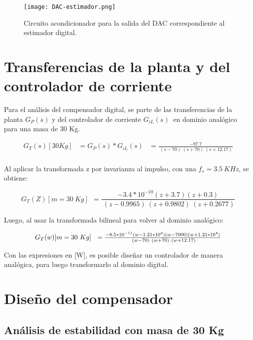 \begin{figure}[H]
	\centering
	\texttt{[image: DAC-estimador.png]}
	\caption{Circuito acondicionador para la salida del DAC correspondiente al estimador digital.}
	\label{fig:DAC-estimador}
\end{figure}

\section{Transferencias de la planta y del controlador de corriente}

\noindent Para el an\'{a}lisis del compensador digital, se parte de las transferencias de la planta $G_P(s)$ y del controlador de corriente $G_{iL}(s)\ $ en dominio anal\'{o}gico para una masa de 30 Kg.

\begin{equation} 
	\begin{aligned}
	G_T(s)[30Kg]&=G_P(s)*G_{iL}(s)&=\frac{-87.7}{\ (s-70)\ (s+70)\ (s+12.17)}\\
	\end{aligned}
\end{equation}

\noindent Al aplicar la transformada z por invarianza al impulso, con una $f_s=3.5\ KHz$, se obtiene:

\begin{equation} 
	G_T(Z)[m=30\ Kg]\ \ =\frac{-3.4*10^{-10}(z+3.7)(z+0.3)}{\ (z-0.9965)\ (z+0.9802)\ (z+0.2677)}
\end{equation}

\noindent Luego, al usar la transformada bilineal para volver al dominio anal\'{o}gico:

\begin{equation}
	\resizebox{.8\hsize}{!}
	{
	$G_T(w)[m=30\ Kg]\ \ =\frac{-8.5*10^{-11}(w-1.21*10^4)(w-7000)(w+1.21*10^4)}{\ (w-70)\ (w+70)\ (w+12.17)}$
	}
\end{equation}


\noindent Con las expresiones en [W], es posible dise\~{n}ar un controlador de manera anal\'{o}gica, para luego transformarlo al dominio digital.


\section{Diseño del compensador}

\subsection{Análisis de estabilidad con masa de 30 Kg}

